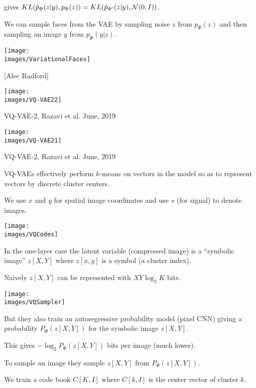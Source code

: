 {{{\vfill
gives {\color{red} $KL(\hat{p}_{\Phi}(z|y),p_\Phi(z)) = KL(\hat{p}_{\Phi'}(z|y),{\cal N}(0,I))$}.
}
}

We can sample faces from the VAE by sampling noise $z$ from $p_\Phi(z)$ and then sampling an image $y$ from $p_\Phi(y|z)$.

\vfill
\centerline{\texttt{[image: \\images/VariationalFaces]}}
\centerline{[Alec Radford]}


\centerline{\texttt{[image: \\images/VQ-VAE22]}}

\vfill
VQ-VAE-2, Razavi et al. June, 2019


\centerline{\texttt{[image: \\images/VQ-VAE21]}}

\vfill
VQ-VAE-2, Razavi et al. June, 2019


VQ-VAEs effectively perform $k$-means on vectors in the model so as to represent vectors by discrete cluster centers.

\vfill
We use $x$ and $y$ for spatial image coordinates and use $s$ (for signal) to denote images.


\centerline{\texttt{[image: \\images/VQCodes]}}

\vfill
In the one-layer case the latent variable (compressed image) is a ``symbolic image'' $z[X,Y]$ where $z[x,y]$ is a symbol (a cluster index).

\vfill
Naively $z[X,Y]$ can be represented with $XY \log_2 K$ bits.


\centerline{\texttt{[image: \\images/VQSampler]}}

But they also train an autoregressive probability model (pixel CNN) giving a probability $P_\Phi(z[X,Y])$ for the symbolic image $z[X,Y]$.

\vfill
This gives  $-\log_2 P_\Phi(z[X,Y])$ bits per image (much lower).

\vfill
To sample an image they sample $z[X,Y]$ from $P_\Phi(z[X,Y])$.



We train a code book $C[K,I]$ where $C[k,I]$ is the center vector of cluster $k$.

}
